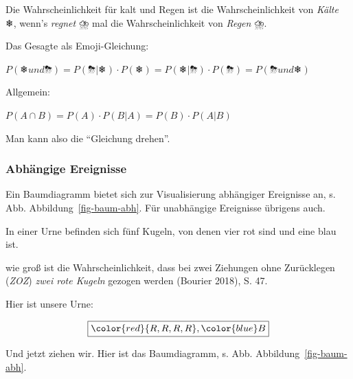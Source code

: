 \documentclass[
  a4paper,
  DIV=11]{scrreprt}
\theoremstyle{definition}
\theoremstyle{remark}
\begin{document}
Die Wahrscheinlichkeit für kalt und Regen ist die Wahrscheinlichkeit von
\emph{Kälte} ❄, wenn's \emph{regnet} ⛈️ mal die Wahrscheinlichkeit von
\emph{Regen} ⛈️.

Das Gesagte als Emoji-Gleichung:

\(P(❄️ und ⛈️) = P(⛈️ |❄️ ) \cdot P(❄️) = P(❄️ |⛈️ ) \cdot P(⛈️) = P(⛈️ und ❄️)\)

Allgemein:

\(P(A\cap B) = P(A) \cdot P(B|A) = P(B) \cdot P(A|B)\)

Man kann also die ``Gleichung drehen''.

\hypertarget{abhuxe4ngige-ereignisse}{%
\subsubsection{Abhängige Ereignisse}\label{abhuxe4ngige-ereignisse}}

Ein Baumdiagramm bietet sich zur Visualisierung abhängiger Ereignisse
an, s. Abb. Abbildung~\ref{fig-baum-abh}. Für unabhängige Ereignisse
übrigens auch.

In einer Urne befinden sich fünf Kugeln, von denen vier rot sind und
eine blau ist.

wie groß ist die Wahrscheinlichkeit, dass bei zwei Ziehungen ohne
Zurücklegen (\emph{ZOZ}) \emph{zwei rote Kugeln} gezogen werden (Bourier
2018), S. 47.

Hier ist unsere Urne:

\[\boxed{\color{red}{R, R, R, R}, \color{blue}B}\]

Und jetzt ziehen wir. Hier ist das Baumdiagramm, s. Abb.
Abbildung~\ref{fig-baum-abh}.
\end{document}
